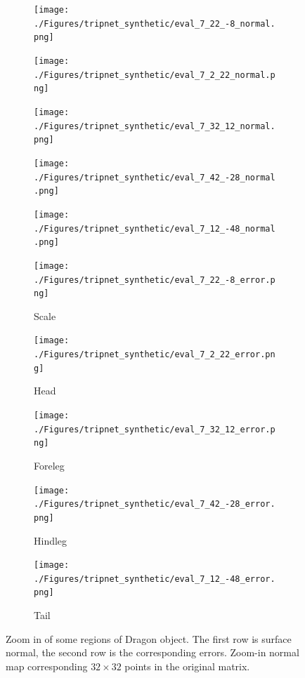\documentclass[border=15pt, multi, tikz]{article}
\begin{document}
\begin{figure}[H]
	\centering
	\begin{subfigure}[b]{0.18\linewidth}
		\texttt{[image: ./Figures/tripnet\_synthetic/eval\_7\_22\_-8\_normal.png]}
	\end{subfigure}
	\begin{subfigure}[b]{0.18\linewidth}
		\texttt{[image: ./Figures/tripnet\_synthetic/eval\_7\_2\_22\_normal.png]}
	\end{subfigure}
	\begin{subfigure}[b]{0.18\linewidth}
		\texttt{[image: ./Figures/tripnet\_synthetic/eval\_7\_32\_12\_normal.png]}
	\end{subfigure}
	\begin{subfigure}[b]{0.18\linewidth}
		\texttt{[image: ./Figures/tripnet\_synthetic/eval\_7\_42\_-28\_normal.png]}
	\end{subfigure}
	\begin{subfigure}[b]{0.18\linewidth}
		\texttt{[image: ./Figures/tripnet\_synthetic/eval\_7\_12\_-48\_normal.png]}
	\end{subfigure}
	
	\begin{subfigure}[b]{0.18\linewidth}
		\texttt{[image: ./Figures/tripnet\_synthetic/eval\_7\_22\_-8\_error.png]}
		\caption{Scale}
	\end{subfigure}
	\begin{subfigure}[b]{0.18\linewidth}
		\texttt{[image: ./Figures/tripnet\_synthetic/eval\_7\_2\_22\_error.png]}
		\caption{Head}
	\end{subfigure}
	\begin{subfigure}[b]{0.18\linewidth}
		\texttt{[image: ./Figures/tripnet\_synthetic/eval\_7\_32\_12\_error.png]}
		\caption{Foreleg}
	\end{subfigure}
	\begin{subfigure}[b]{0.18\linewidth}
		\texttt{[image: ./Figures/tripnet\_synthetic/eval\_7\_42\_-28\_error.png]}
		\caption{Hindleg}
	\end{subfigure}
	\begin{subfigure}[b]{0.18\linewidth}
		\texttt{[image: ./Figures/tripnet\_synthetic/eval\_7\_12\_-48\_error.png]}
		\caption{Tail}
	\end{subfigure}
	
	
	\caption{Zoom in of some regions of Dragon object. The first row is surface normal, the second row is the corresponding errors. Zoom-in normal map corresponding $ 32\times32 $ points in the original matrix.}
	\label{fig:tripnet-eval-synthetic-zoom-in}
\end{figure}
\end{document}
